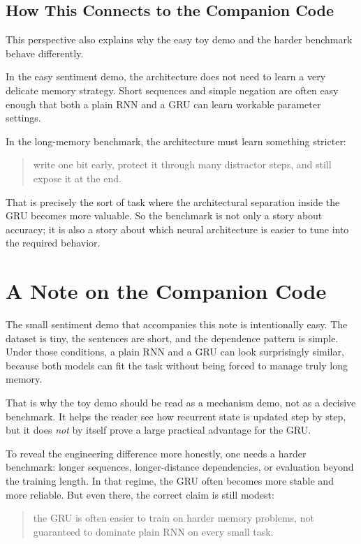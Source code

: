 \documentclass[12pt,a4paper]{article}
\begin{document}
\subsection{How This Connects to the Companion Code}

This perspective also explains why the easy toy demo and the harder benchmark behave differently.

In the easy sentiment demo, the architecture does not need to learn a very delicate memory strategy. Short sequences and simple negation are often easy enough that both a plain RNN and a GRU can learn workable parameter settings.

In the long-memory benchmark, the architecture must learn something stricter:
\begin{quote}
write one bit early, protect it through many distractor steps, and still expose it at the end.
\end{quote}

That is precisely the sort of task where the architectural separation inside the GRU becomes more valuable. So the benchmark is not only a story about accuracy; it is also a story about which neural architecture is easier to tune into the required behavior.

\section{A Note on the Companion Code}

The small sentiment demo that accompanies this note is intentionally easy. The dataset is tiny, the sentences are short, and the dependence pattern is simple. Under those conditions, a plain RNN and a GRU can look surprisingly similar, because both models can fit the task without being forced to manage truly long memory.

That is why the toy demo should be read as a mechanism demo, not as a decisive benchmark. It helps the reader see how recurrent state is updated step by step, but it does \emph{not} by itself prove a large practical advantage for the GRU.

To reveal the engineering difference more honestly, one needs a harder benchmark: longer sequences, longer-distance dependencies, or evaluation beyond the training length. In that regime, the GRU often becomes more stable and more reliable. But even there, the correct claim is still modest:
\begin{quote}
the GRU is often easier to train on harder memory problems, not guaranteed to dominate plain RNN on every small task.
\end{quote}
\end{document}

